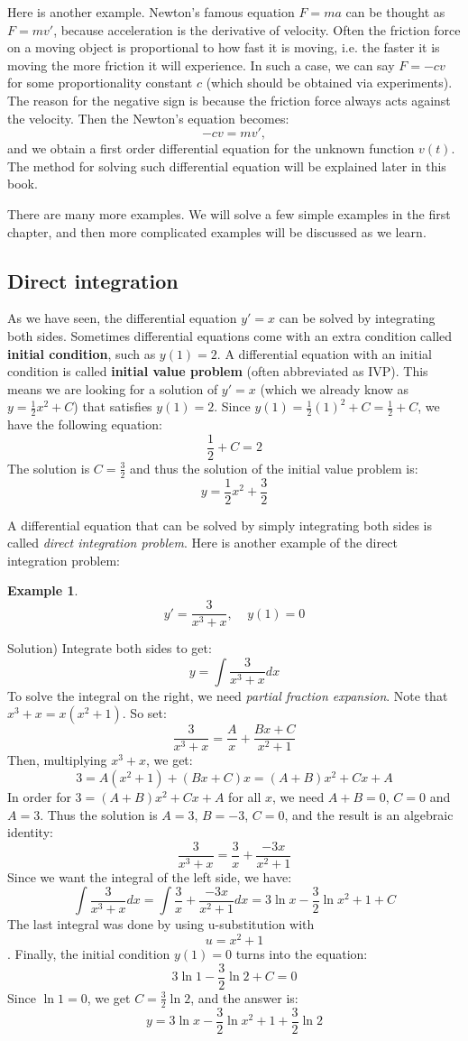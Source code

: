 \documentclass[12pt]{report}
\newtheorem{ex}{Example}[section]
\begin{document}
Here is another example. Newton's famous equation $F=ma$ can be thought as $F=m v'$, because acceleration is the derivative of velocity. Often the friction force on a moving object is proportional to how fast it is moving, i.e. the faster it is moving the more friction it will experience. In such a case, we can say $F= -cv$ for some proportionality constant $c$ (which should be obtained via experiments). The reason for the negative sign is because the friction force always acts against the velocity. Then the Newton's equation becomes:
$$-cv=mv',$$
and we obtain a first order differential equation for the unknown function $v(t)$. The method for solving such differential equation will be explained later in this book. 

There are many more examples. We will solve a few simple examples in the first chapter, and then more complicated examples will be discussed as we learn. 

\subsection*{Direct integration} 
As we have seen, the differential equation $y'= x$ can be solved by integrating both sides. Sometimes differential equations come with an extra condition called \textbf{initial condition}, such as $y(1)=2$.  A differential equation with an initial condition is called \textbf{initial value problem} (often abbreviated as IVP). This means we are looking for a solution of $y'=x$ (which we already know as $y = \frac{1}{2} x^2 +C $) that satisfies $y(1)=2$. Since $y(1)=\frac{1}{2}(1)^2+C=\frac{1}{2}+C$, we have the following equation:
$$\frac{1}{2}+C=2$$
The solution is $C=\frac{3}{2}$ and thus the solution of the initial value problem is:
$$y= \frac{1}{2} x^2 + \frac{3}{2} $$

A differential equation that can be solved by simply integrating both sides is called \textit{direct integration problem}. Here is another example of the direct integration problem:
\begin{ex} $$y'= \frac{3}{x^3+x}, \;\;\;\; y(1)=0$$
	\end{ex}
Solution)
Integrate both sides to get:
$$y= \int \frac{3}{x^3+x} dx $$
To solve the integral on the right, we need \textit{partial fraction expansion}. Note that $x^3+x=x(x^2+1)$. So set:
$$\frac{3}{x^3+x} = \frac{A}{x}+\frac{Bx+C}{x^2+1}$$
Then, multiplying $x^3+x$, we get:
$$3= A(x^2+1)+(Bx+C)x=(A+B)x^2+Cx+A$$
In order for $3=(A+B)x^2+Cx+A$ for all $x$, we need $A+B=0$, $C=0$ and $A=3$. Thus the solution is $A=3$, $B=-3$, $C=0$, and the result is an algebraic identity:
$$\frac{3}{x^3+x} = \frac{3}{x}+\frac{-3x}{x^2+1}$$
Since we want the integral of the left side, we have:
$$\int \frac{3}{x^3+x} dx =\int \frac{3}{x}+\frac{-3x}{x^2+1} dx = 3 \ln x -\frac{3}{2} \ln {x^2+1} +C $$
The last integral was done by using u-substitution with $$u=x^2+1$$.
Finally, the initial condition $ y(1)=0$ turns into the equation:
$$3 \ln 1 -\frac{3}{2} \ln 2 +C = 0$$
Since $\ln 1=0$, we get $C= \frac{3}{2} \ln 2$, and the answer is:
$$y = 3 \ln x -\frac{3}{2} \ln {x^2+1} + \frac{3}{2} \ln 2$$ 
\end{document}
